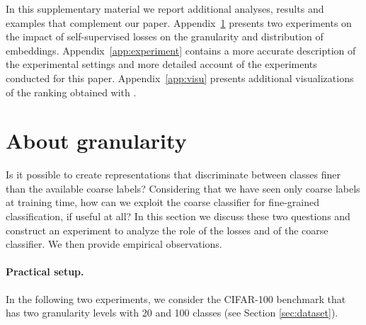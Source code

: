 \appendix\newpage





In this supplementary material we report additional analyses, results and examples that complement our paper.  
Appendix~\ref{sec:disc_gran} presents two experiments on the impact of self-supervised losses on the granularity and distribution of embeddings.
Appendix~\ref{app:experiment} contains a more accurate description of the experimental settings and more detailed account of the experiments conducted for this paper.
Appendix~\ref{app:visu} presents additional visualizations of the ranking obtained with \ours.



\newcommand{\norm}[1]{\left\lVert#1\right\rVert_2}

\newtheorem{definition}{Definition}

\section{About granularity}
\label{sec:disc_gran}

Is it possible to create representations that discriminate between classes finer than the available coarse labels?  
Considering that we have seen only coarse labels at training time, how can we exploit the coarse classifier for fine-grained classification, if useful at all? 
In this section we discuss these two questions and construct an experiment to analyze the role of the losses and of the coarse classifier. 
We then provide empirical observations. 

\paragraph{Practical setup. } 

In the following two experiments, we consider the CIFAR-100 benchmark that has two granularity levels with 20 and 100 classes (see Section \ref{sec:dataset}).

